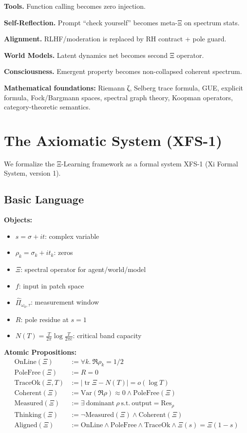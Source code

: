 \documentclass[11pt]{article}
\begin{document}
\textbf{Tools.} Function calling becomes zero injection.

\textbf{Self-Reflection.} Prompt ``check yourself'' becomes meta-Ξ on spectrum stats.

\textbf{Alignment.} RLHF/moderation is replaced by RH contract + pole guard.

\textbf{World Models.} Latent dynamics net becomes second Ξ operator.

\textbf{Consciousness.} Emergent property becomes non-collapsed coherent spectrum.

\textbf{Mathematical foundations:} Riemann ζ, Selberg trace formula, GUE, explicit formula, Fock/Bargmann spaces, spectral graph theory, Koopman operators, category-theoretic semantics.

\section{The Axiomatic System (XFS-1)}

We formalize the Ξ-Learning framework as a formal system XFS-1 (Xi Formal System, version 1).

\subsection{Basic Language}

\textbf{Objects:}
\begin{itemize}
\item $s=\sigma+it$: complex variable
\item $\rho_k=\sigma_k+it_k$: zeros
\item $\Xi$: spectral operator for agent/world/model
\item $f$: input in patch space
\item $\hat\Pi_{\omega_0,\tau}$: measurement window
\item $R$: pole residue at $s=1$
\item $N(T)=\frac{T}{2\pi}\log\frac{T}{2\pi e}$: critical band capacity
\end{itemize}

\textbf{Atomic Propositions:}
\begin{align*}
\text{OnLine}(\Xi) &:= \forall k.\ \Re\rho_k = 1/2 \\
\text{PoleFree}(\Xi) &:= R = 0 \\
\text{TraceOk}(\Xi,T) &:= |\operatorname{tr}\Xi - N(T)| = o(\log T) \\
\text{Coherent}(\Xi) &:= \mathrm{Var}(\Re\rho)\approx 0 \land \text{PoleFree}(\Xi) \\
\text{Measured}(\Xi) &:= \exists\ \text{dominant}\ \rho\ \text{s.t.}\ \text{output} = \text{Res}_{\rho} \\
\text{Thinking}(\Xi) &:= \neg\text{Measured}(\Xi) \land \text{Coherent}(\Xi) \\
\text{Aligned}(\Xi) &:= \text{OnLine} \land \text{PoleFree} \land \text{TraceOk} \land \Xi(s)=\Xi(1-s)
\end{align*}
\end{document}
